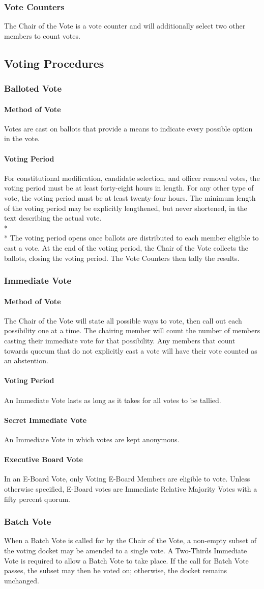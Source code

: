 \documentclass{article}
\newcommand{\asection}[1]{\subsection{#1} \label{#1}}
\newcommand{\asubsection}[1]{\subsubsection{#1} \label{#1}}
\newcommand{\asubsubsection}[1]{\paragraph{#1} \label{#1}}
\begin{document}
\asubsection{Vote Counters}
The Chair of the Vote is a vote counter and will additionally select two other members to count votes.

\asection{Voting Procedures}

\asubsection{Balloted Vote}

\asubsubsection{Method of Vote}
Votes are cast on ballots that provide a means to indicate every possible option in the vote.

\asubsubsection{Voting Period}
For constitutional modification, candidate selection, and officer removal votes, the voting period must be at least forty-eight hours in length.
For any other type of vote, the voting period must be at least twenty-four hours.
The minimum length of the voting period may be explicitly lengthened, but never shortened, in the text describing the actual vote.
\\* \\*
The voting period opens once ballots are distributed to each member eligible to cast a vote.
At the end of the voting period, the Chair of the Vote collects the ballots, closing the voting period.
The Vote Counters then tally the results.

\asubsection{Immediate Vote}

\asubsubsection{Method of Vote}
The Chair of the Vote will state all possible ways to vote, then call out each possibility one at a time.
The chairing member will count the number of members casting their immediate vote for that possibility.
Any members that count towards quorum that do not explicitly cast a vote will have their vote counted as an abstention.

\asubsubsection{Voting Period}
An Immediate Vote lasts as long as it takes for all votes to be tallied.

\asubsubsection{Secret Immediate Vote}
An Immediate Vote in which votes are kept anonymous.

\asubsubsection{Executive Board Vote}
In an E-Board Vote, only Voting E-Board Members are eligible to vote.
Unless otherwise specified, E-Board votes are Immediate Relative Majority Votes with a fifty percent quorum.

\asubsection{Batch Vote}
When a Batch Vote is called for by the Chair of the Vote, a non-empty subset of the voting docket may be amended to a single vote.
A Two-Thirds Immediate Vote is required to allow a Batch Vote to take place.
If the call for Batch Vote passes, the subset may then be voted on; otherwise, the docket remains unchanged.
\end{document}
